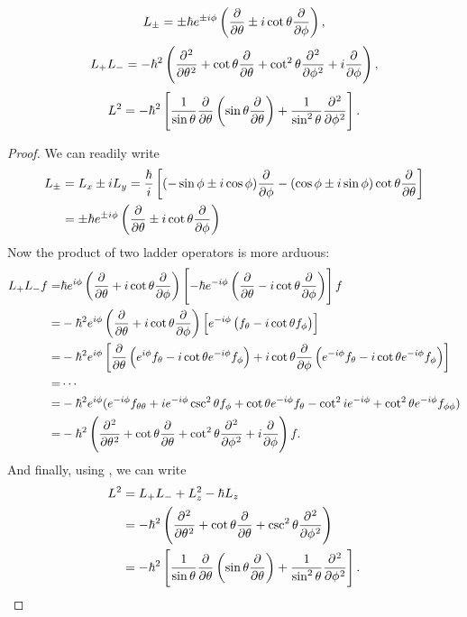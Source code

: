 \begin{prt}
\begin{equation}
L_{\pm}=\pm\hbar e^{\pm i\phi}\lf(\diffp{}{\theta}\pm i\cot\theta\diffp{}{\phi} \rt), 
\end{equation}
\begin{equation}
L_+L_-=-\hbar^2\lf(\diffp[2]{}{\theta}+\cot\theta\diffp{}{\theta}+\cot^2\theta\diffp[2]{}{\phi}+i\diffp{}{\phi} \rt),
\end{equation}
\begin{equation}
L^2=-\hbar^2\lf[\frac{1}{\sin\theta}\diffp{}{\theta}\lf(\sin\theta\diffp{}{\theta} \rt)+\frac{1}{\sin^2\theta}\diffp[2]{}{\phi} \rt]. 
\end{equation}
\end{prt}
\begin{proof}
We can readily write
\begin{equation}
\begin{aligned}
L_{\pm}&=L_x\pm iL_y=\frac{\hbar}{i}\lf[(-\sin\phi\pm i\cos\phi)\diffp{}{\phi}-(\cos\phi\pm i\sin\phi)\cot\theta\diffp{}{\theta} \rt]\\
&=\pm\hbar e^{\pm i\phi}\lf(\diffp{}{\theta}\pm i\cot\theta\diffp{}{\phi} \rt)
\end{aligned}
\end{equation}
Now the product of two ladder operators is more arduous:
\begin{equation}
\begin{aligned}
L_+L_-f=&\hbar e^{i\phi}\lf(\diffp{}{\theta}+i\cot\theta\diffp{}{\phi} \rt)\lf[-\hbar e^{-i\phi}\lf(\diffp{}{\theta}-i\cot\theta\diffp{}{\phi} \rt) \rt]f\\
=&-\hbar^2 e^{i\phi}\lf(\diffp{}{\theta}+i\cot\theta\diffp{}{\phi} \rt)\lf[e^{-i\phi}\lf(f_{\theta}-i\cot\theta f_{\phi} \rt) \rt]\\
=&-\hbar^2 e^{i\phi}\lf[\diffp{}{\theta}\lf(e^{i\phi}f_{\theta}-i\cot\theta e^{-i\phi}f_{\phi} \rt)+i\cot\theta\diffp{}{\phi}\lf(e^{-i\phi}f_{\theta}-i\cot\theta e^{-i\phi}f_{\phi} \rt) \rt]\\
=&\cdots\\
=&-\hbar^2e^{i\phi}(e^{-i\phi}f_{\theta\theta}+ie^{-i\phi}\csc^2\theta f_{\phi}+\cot\theta e^{-i\phi}f_{\theta}-\cot^2ie^{-i\phi}+\cot^2\theta e^{-i\phi}f_{\phi\phi})\\
=&-\hbar^2\lf(\diffp[2]{}{\theta}+\cot\theta\diffp{}{\theta}+\cot^2\theta\diffp[2]{}{\phi}+i\diffp{}{\phi} \rt)f. 
\end{aligned}
\end{equation}
And finally, using , we can write
\begin{equation}
\label{l2sph}
\begin{aligned}
L^2&=L_+L_-+L^2_z-\hbar L_z\\
&=-\hbar^2\lf(\diffp[2]{}{\theta}+\cot\theta\diffp{}{\theta}+\csc^2\theta\diffp[2]{}{\phi} \rt)\\
&=-\hbar^2\lf[\frac{1}{\sin\theta}\diffp{}{\theta}\lf(\sin\theta\diffp{}{\theta} \rt)+\frac{1}{\sin^2\theta}\diffp[2]{}{\phi} \rt].
\end{aligned}
\end{equation}
\end{proof}
